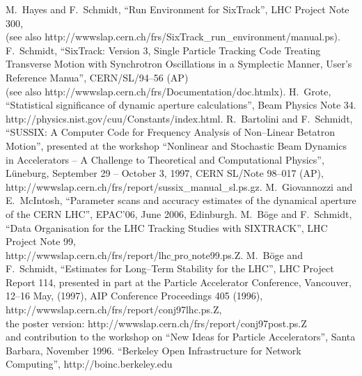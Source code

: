 \documentclass{cernatsnote}    %
\begin{document}
\begin{thebibliography}{99}
%
 M.~Hayes and F.~Schmidt, ``Run Environment for SixTrack'',
  LHC Project Note 300,\\
  (see also http://wwwslap.cern.ch/frs/SixTrack\_run\_environment/manual.ps).
%
 F.~Schmidt, ``SixTrack: Version 3, Single Particle
  Tracking Code Treating Transverse Motion with Synchrotron
  Oscillations in a Symplectic Manner, User's Reference Manua'',
  CERN/SL/94--56 (AP)\\
  (see also http://wwwslap.cern.ch/frs/Documentation/doc.htmlx).
%
 H.~Grote, ``Statistical significance of dynamic
  aperture calculations'', Beam Physics Note 34.
%
 
  {http://physics.nist.gov/cuu/Constants/index.html}.
%
 R.~Bartolini and F.~Schmidt, ``SUSSIX: A Computer
  Code for Frequency Analysis of Non--Linear Betatron Motion'',
  presented at the workshop ``Nonlinear and Stochastic Beam Dynamics
  in Accelerators -- A Challenge to Theoretical and Computational
  Physics'', L\"uneburg, September 29 -- October 3, 1997, CERN SL/Note
  98--017 (AP),
  {http://wwwslap.cern.ch/frs/report/sussix\_manual\_sl.ps.gz}.
%
M.~Giovannozzi and E.~McIntosh, ``Parameter scans and accuracy estimates
of the dynamical aperture of the CERN LHC'', EPAC'06, June 2006, Edinburgh.
%
 M.~B\"oge and F.~Schmidt, ``Data Organisation for
  the LHC Tracking Studies with SIXTRACK'', LHC Project Note 99,\\
  {http://wwwslap.cern.ch/frs/report/lhc$\_$pro$\_$note99.ps.Z}.
%
 M.~B\"oge and F.~Schmidt, ``Estimates for Long--Term
  Stability for the LHC'', LHC Project Report 114, presented in part
  at the Particle Accelerator Conference, Vancouver, 12--16 May,
  (1997), AIP Conference Proceedings 405 (1996),
  {http://wwwslap.cern.ch/frs/report/conj97lhc.ps.Z},\\
  the poster version:
  {http://wwwslap.cern.ch/frs/report/conj97post.ps.Z} \\
  and contribution to the workshop on ``New Ideas for Particle
  Accelerators'', Santa Barbara, November 1996.
%
 ``Berkeley Open Infrastructure for Network Computing'',
   http://boinc.berkeley.edu
\end{thebibliography}

\clearpage
\end{document}
